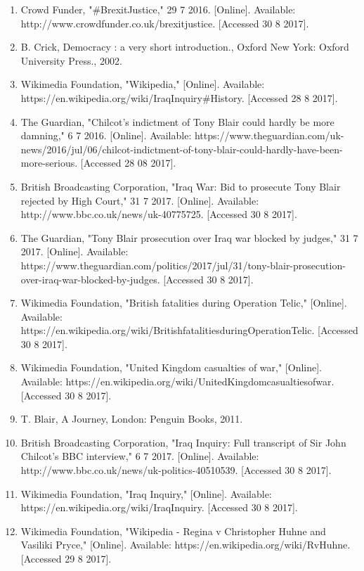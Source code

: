 \documentclass[11pt,a4paper]{report}
\begin{document}
\begin{flushleft}
\begin{enumerate}
			\item Crowd Funder, "{\#}BrexitJustice," 29 7 2016. [Online]. Available: http://www.crowdfunder.co.uk/brexitjustice. [Accessed 30 8 2017].
			\item B. Crick, Democracy : a very short introduction., Oxford New York: Oxford University Press., 2002. 
			\item Wikimedia Foundation, "Wikipedia," [Online]. Available: https://en.wikipedia.org/wiki/Iraq{\textunderscore}Inquiry{\#}History. [Accessed 28 8 2017].
			\item The Guardian, "Chilcot's indictment of Tony Blair could hardly be more damning," 6 7 2016. [Online]. Available: https://www.theguardian.com/uk-news/2016/jul/06/chilcot-indictment-of-tony-blair-could-hardly-have-been-more-serious. [Accessed 28 08 2017].
			\item British Broadcasting Corporation, "Iraq War: Bid to prosecute Tony Blair rejected by High Court," 31 7 2017. [Online]. Available: http://www.bbc.co.uk/news/uk-40775725. [Accessed 30 8 2017].
			\item The Guardian, "Tony Blair prosecution over Iraq war blocked by judges," 31 7 2017. [Online]. Available: https://www.theguardian.com/politics/2017/jul/31/tony-blair-prosecution-over-iraq-war-blocked-by-judges. [Accessed 30 8 2017].
			\item Wikimedia Foundation, "British fatalities during Operation Telic," [Online]. Available: https://en.wikipedia.org/wiki/British{\textunderscore}fatalities{\textunderscore}during{\textunderscore}Operation{\textunderscore}Telic. [Accessed 30 8 2017].
			\item Wikimedia Foundation, "United Kingdom casualties of war," [Online]. Available: https://en.wikipedia.org/wiki/United{\textunderscore}Kingdom{\textunderscore}casualties{\textunderscore}of{\textunderscore}war. [Accessed 30 8 2017].
			\item T. Blair, A Journey, London: Penguin Books, 2011. 
			\item British Broadcasting Corporation, "Iraq Inquiry: Full transcript of Sir John Chilcot's BBC interview," 6 7 2017. [Online]. Available: http://www.bbc.co.uk/news/uk-politics-40510539. [Accessed 30 8 2017].
			\item Wikimedia Foundation, "Iraq Inquiry," [Online]. Available: https://en.wikipedia.org/wiki/Iraq{\textunderscore}Inquiry. [Accessed 30 8 2017].
			\item Wikimedia Foundation, "Wikipedia - Regina v Christopher Huhne and Vasiliki Pryce," [Online]. Available: https://en.wikipedia.org/wiki/R{\textunderscore}v{\textunderscore}Huhne. [Accessed 29 8 2017].

\end{enumerate}
\end{flushleft}
\end{document}
